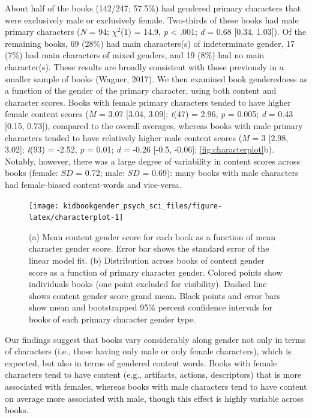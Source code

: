 \documentclass[
  english,
  ,man,floatsintext]{apa6}
\begin{document}
About half of the books (142/247; 57.5\%) had gendered primary characters that were exclusively male or exclusively female. Two-thirds of these books had male primary characters (\emph{N} = 94; \(\chi^2\)(1) = 14.9, \emph{p} \textless{} .001; \emph{d} = 0.68 {[}0.34, 1.03{]}). Of the remaining books, 69 (28\%) had main characters(s) of indeterminate gender, 17 (7\%) had main characters of mixed genders, and 19 (8\%) had no main character(s). These results are broadly consistent with those previously in a smaller sample of books (Wagner, 2017). We then examined book genderedness as a function of the gender of the primary character, using both content and character scores. Books with female primary characters tended to have higher female content scores (\emph{M} = 3.07 {[}3.04, 3.09{]}; \emph{t}(47) = 2.96, \emph{p} = 0.005; \emph{d} = 0.43 {[}0.15, 0.73{]}), compared to the overall averages, whereas books with male primary characters tended to have relatively higher male content scores (\emph{M} = 3 {[}2.98, 3.02{]}; \emph{t}(93) = -2.52, \emph{p} = 0.01; \emph{d} = -0.26 {[}-0.5, -0.06{]}; \autoref{fig:characterplot}b). Notably, however, there was a large degree of variability in content scores across books (female: \(SD\) = 0.72; male: \(SD\) = 0.69): many books with male characters had female-biased content-words and vice-versa.

\begin{figure}[t!]
\texttt{[image: kidbookgender\_psych\_sci\_files/figure-latex/characterplot-1]} \caption{(a) Mean content gender score for each book as a function of mean character gender score. Error bar shows the standard error of the linear model fit.  (b) Distribution across books of content gender score as a function of primary character gender. Colored points show individuals books (one point excluded for visibility). Dashed line shows content gender score grand mean. Black points and error bars show mean and bootstrapped 95\% percent confidence intervals for books of each primary character gender type.}\label{fig:characterplot}
\end{figure}

Our findings suggest that books vary considerably along gender not only in terms of characters (i.e., those having only male or only female characters), which is expected, but also in terms of gendered content words. Books with female characters tend to have content (e.g., artifacts, actions, descriptors) that is more associated with females, whereas books with male characters tend to have content on average more associated with male, though this effect is highly variable across books.
\end{document}
